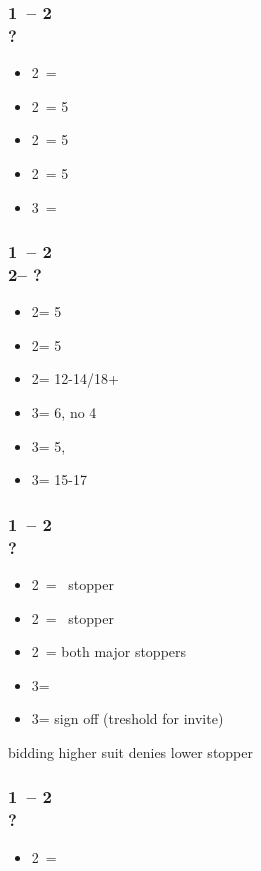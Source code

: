 \documentclass[12pt, a4paper]{article}
\begin{document}
\subsubsection*{1\clubs\ -- 2\clubs \\ ?}
\begin{itemize}
    \item 2\diams\ = \bal
    \item 2\hearts\ = 5\hearts\ \unbal
    \item 2\spades\ = 5\spades\ \unbal
    \item 2\nt\ = 5\diams\ \unbal
    \item 3\clubs\ = \clubs\ \unbal
\end{itemize}

\subsubsection*{1\clubs\ -- 2\clubs \\
                2\diams -- ?}
\begin{itemize}
    \item 2\hearts = 5\hearts\ \unbal
    \item 2\spades = 5\spades\ \unbal
    \item 2\nt = 12-14/18+ \bal
    \item 3\clubs = 6\clubs, no 4\major
    \item 3\diams = 5\diams, \gf
    \item 3\nt = 15-17 \bal
\end{itemize}

\subsubsection*{1\diams\ -- 2\diams \\ ?}
\begin{itemize}
    \item 2\hearts\ = \hearts\ stopper
    \item 2\spades\ = \spades\ stopper
    \item 2\nt\ = both major stoppers
    \item 3\clubs = \nat
    \item 3\diams = sign off (treshold for invite)
\end{itemize}

bidding higher suit denies lower stopper

\subsubsection*{1\minor\ -- 2\hearts \\ ?}
\begin{itemize}
    \item 2\nt\ = \lsf
\end{itemize}
\end{document}
